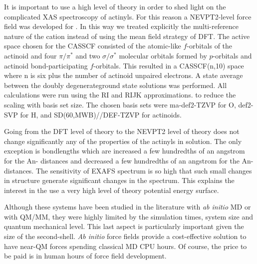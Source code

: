 It is important to use a high level of theory in order to shed light on the complicated 
XAS spectroscopy of actinyls. For this reason a NEVPT2\cite{NEVPT2_1,NEVPT2_2,NEVPT2_3}-level force 
field was developed for  \ce{[NpO2*(H2O)5]^{+}}. In this way we treated explicitly the 
multi-reference nature of the cation instead of using the mean field 
strategy of DFT. The active 
space chosen for the CASSCF consisted of the atomic-like $f$-orbitals of the actinoid and four 
$\pi/\pi^*$ and two $\sigma/\sigma^*$ molecular orbitals formed by  $p$-orbitals and 
actinoid bond-participating $f$-orbitals. This resulted in a CASSCF(n,10) space where n is six plus 
the number of actinoid unpaired electrons. A state average 
between the doubly degenerate\newline ground state solutions was performed. All calculations were 
run 
using the RI 
and RIJK approximations.\cite{RI1_Dunlap_JChemPhys_1979,RI2_JCompChem_Alsenoy_1988,
RI3_Kendall_TheoChemAcc_1997,
RI4_Ahlrich_ChemPhysLett_1995,RI5_Ahlrich_TheoChemAcc_1997} to reduce the scaling with basis set 
size. The chosen basis sets were ma-def2-TZVP for O, def2-SVP for H, and 
\newline SD(60,MWB)//DEF-TZVP for 
actinoids\cite{Def2weigend2005,ma-Def-rappoport2010,RECPStuttgart}.


Going from the DFT level of theory to the NEVPT2 level of theory does not change significantly any 
of the properties of the actinyls in solution. The only exception is bondlengths which are 
increased a few hundredths of an angstrom for the An- distances and decreased a few 
hundredths of an \newline angstrom for the An- distances. The sensitivity of EXAFS 
spectrum is so 
high that such small changes in structure generate significant changes in the spectrum. This 
explains 
the interest in the use a very high level of theory potential energy surface. 

Although these systems have been studied in the literature with \textit{ab initio} 
MD\cite{JACS_Buhl_2005} or with
QM/MM\cite{JPhysChemA_Frick_2009}, they were highly limited by the simulation times, system 
size and quantum mechanical level. 
This last aspect is particularly important given the size of the second-shell. 
\textit{Ab initio} force fields provide a cost-effective solution to have near-QM 
forces spending classical MD CPU hours. Of course, the price to be paid is in human hours of force 
field development. 

